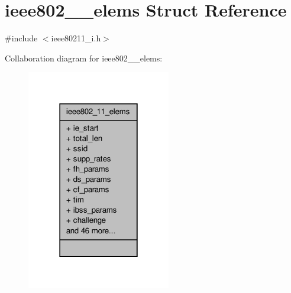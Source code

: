 \hypertarget{structieee802__11__elems}{\section{ieee802\-\_\-\_\-elems Struct Reference}
\label{structieee802__11__elems}
}


{\ttfamily \#include $<$ieee80211\-\_\-i.\-h$>$}



Collaboration diagram for ieee802\-\_\-\_\-elems\-:
\nopagebreak
\begin{figure}[H]
\begin{center}
\leavevmode
\includegraphics[width=178pt]{structieee802__11__elems__coll__graph}
\end{center}
\end{figure}
